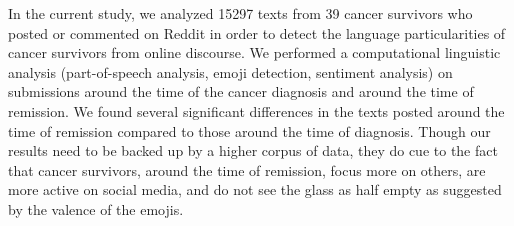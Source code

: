 In the current study, we analyzed 15297 texts from 39 cancer survivors who posted or commented on Reddit in order to detect the language particularities of cancer survivors from online discourse. We performed a computational linguistic analysis (part-of-speech analysis, emoji detection, sentiment analysis) on submissions around the time of the cancer diagnosis and around the time of remission. We found several significant differences in the texts posted around the time of remission compared to those around the time of diagnosis. Though our results need to be backed up by a higher corpus of data, they do cue to the fact that cancer survivors, around the time of remission, focus more on others, are more active on social media, and do not see the glass as half empty as suggested by the valence of the emojis.
